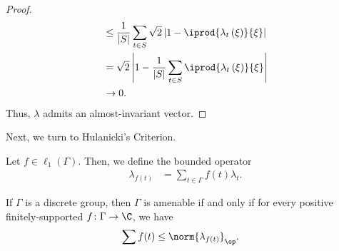 \documentclass[10pt]{mypackage}
\begin{document}
\begin{proof}
\begin{align*}
                                                                                    &\leq \frac{1}{\left\vert S \right\vert}\sum_{t\in S}\sqrt{2}\left\vert 1 - \iprod{\lambda_t\left( \xi \right)}{\xi} \right\vert\\
                                                                                    &= \sqrt{2}\left\vert 1 - \frac{1}{\left\vert S \right\vert} \sum_{t\in S} \iprod{\lambda_t\left( \xi \right)}{\xi}\right\vert\\
                                                                                    &\rightarrow 0.
  \end{align*}
  Thus, $\lambda$ admits an almost-invariant vector.
\end{proof}
Next, we turn to Hulanicki's Criterion.
\begin{definition}
  Let $f\in \ell_1\left( \Gamma \right)$. Then, we define the bounded operator
  \begin{align*}
    \lambda_{f(t)} &= \sum_{t\in\Gamma}f(t)\lambda_t.
  \end{align*}
\end{definition}
\begin{theorem}
  If $\Gamma$ is a discrete group, then $\Gamma$ is amenable if and only if for every positive finitely-supported $f\colon \Gamma\rightarrow \C$, we have
  \begin{align*}
    \sum f(t) &\leq \norm{\lambda_{f(t)}}_{\op}.
  \end{align*}
\end{theorem}
\end{document}
